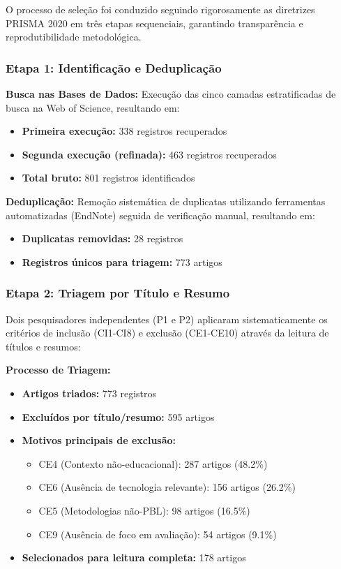 \documentclass[english, spanish, brazilian]{RBIEarticle} %
\begin{document}
O processo de seleção foi conduzido seguindo rigorosamente as diretrizes PRISMA 2020 \parencite{Page2021} em três etapas sequenciais, garantindo transparência e reprodutibilidade metodológica.

\subsubsection{Etapa 1: Identificação e Deduplicação}

\textbf{Busca nas Bases de Dados:} Execução das cinco camadas estratificadas de busca na Web of Science, resultando em:
\begin{itemize}
\item \textbf{Primeira execução:} 338 registros recuperados
\item \textbf{Segunda execução (refinada):} 463 registros recuperados  
\item \textbf{Total bruto:} 801 registros identificados
\end{itemize}

\textbf{Deduplicação:} Remoção sistemática de duplicatas utilizando ferramentas automatizadas (EndNote) seguida de verificação manual, resultando em:
\begin{itemize}
\item \textbf{Duplicatas removidas:} 28 registros
\item \textbf{Registros únicos para triagem:} 773 artigos
\end{itemize}

\subsubsection{Etapa 2: Triagem por Título e Resumo}

Dois pesquisadores independentes (P1 e P2) aplicaram sistematicamente os critérios de inclusão (CI1-CI8) e exclusão (CE1-CE10) através da leitura de títulos e resumos:

\textbf{Processo de Triagem:}
\begin{itemize}
\item \textbf{Artigos triados:} 773 registros
\item \textbf{Excluídos por título/resumo:} 595 artigos
\item \textbf{Motivos principais de exclusão:}
  \begin{itemize}
  \item CE4 (Contexto não-educacional): 287 artigos (48.2\%)
  \item CE6 (Ausência de tecnologia relevante): 156 artigos (26.2\%)
  \item CE5 (Metodologias não-PBL): 98 artigos (16.5\%)
  \item CE9 (Ausência de foco em avaliação): 54 artigos (9.1\%)
  \end{itemize}
\item \textbf{Selecionados para leitura completa:} 178 artigos
\end{itemize}
\end{document}
